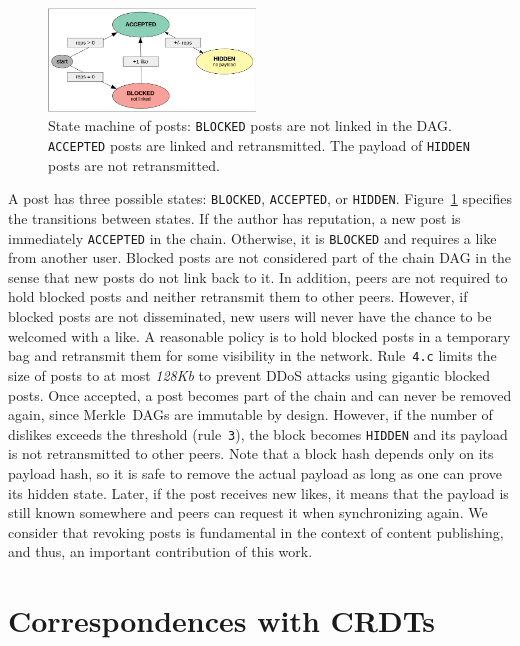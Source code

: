\documentclass[10pt,journal,compsoc]{IEEEtran}
\newcommand{\code}[1]  {\texttt{\footnotesize{#1}}}
\begin{document}
\begin{figure}
\centering
\includegraphics[width=0.49\textwidth]{state.png}
\caption{
    State machine of posts:
    \code{BLOCKED} posts are not linked in the DAG.
    \code{ACCEPTED} posts are linked and retransmitted.
    The payload of \code{HIDDEN} posts are not retransmitted.
}
\label{fig.state}
\end{figure}

A post has three possible states: \code{BLOCKED}, \code{ACCEPTED}, or
\code{HIDDEN}.
Figure~\ref{fig.state} specifies the transitions between states.
%
If the author has reputation, a new post is immediately \code{ACCEPTED} in the
chain.
%
Otherwise, it is \code{BLOCKED} and requires a like from another user.
Blocked posts are not considered part of the chain DAG in the sense that new
posts do not link back to it.
In addition, peers are not required to hold blocked posts and neither
retransmit them to other peers.
However, if blocked posts are not disseminated, new users will never have the
chance to be welcomed with a like.
A reasonable policy is to hold blocked posts in a temporary bag and retransmit
them for some visibility in the network.
Rule~\code{4.c} limits the size of posts to at most \emph{128Kb} to prevent
DDoS attacks using gigantic blocked posts.
%
Once accepted, a post becomes part of the chain and can never be removed
again, since Merkle~DAGs are immutable by design.
%
However, if the number of dislikes exceeds the threshold (rule~\code{3}), the
block becomes \code{HIDDEN} and its payload is not retransmitted to other
peers.
Note that a block hash depends only on its payload hash, so it is safe to
remove the actual payload as long as one can prove its hidden state.
Later, if the post receives new likes, it means that the payload is still known
somewhere and peers can request it when synchronizing again.
We consider that revoking posts is fundamental in the context of content
publishing, and thus, an important contribution of this work.

\section{Correspondences with CRDTs}
\label{sec.crdts}
\end{document}
